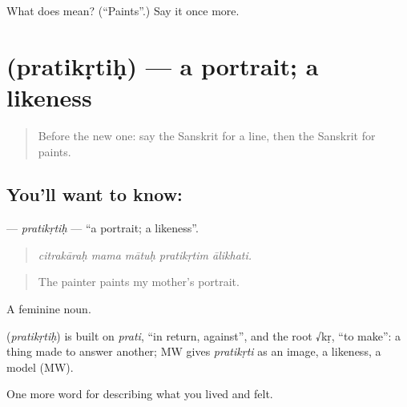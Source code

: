 \begin{tcolorbox}[breakable,colback=teal!4,colframe=teal!35!black,title={Before you move on}]
What does  mean? (\textquotedblleft{}Paints\textquotedblright{}.) Say it once more.
\end{tcolorbox}
\section[\texorpdfstring{\sk{प्रतिकृतिः} (pratikṛtiḥ)}{प्रतिकृतिः (pratikṛtiḥ)}]{ (pratikṛtiḥ) — a portrait; a likeness}

\label{lesson:SA-C518-pratikrtih}



\begin{quote}
Before the new one: say the Sanskrit for a line, then the Sanskrit for paints.
\end{quote}

\subsection*{You'll want to know: }
\textbf{} — \emph{pratikṛtiḥ} — \textquotedblleft{}a portrait; a likeness\textquotedblright{}.

\begin{quote}
    
\end{quote}

\begin{quote}
\emph{citrakāraḥ mama mātuḥ pratikṛtim ālikhati.}
\end{quote}

\begin{quote}
The painter paints my mother's portrait.
\end{quote}

A feminine noun.

\begin{cousinweb}
\textbf{} (\emph{pratikṛtiḥ}) is built on \emph{prati}, \textquotedblleft{}in return, against\textquotedblright{}, and the root √kṛ, \textquotedblleft{}to make\textquotedblright{}: a thing made to answer another; MW gives \emph{pratikṛti} as an image, a likeness, a model (MW).
\end{cousinweb}

\begin{grammarlens}[title={What you've built}]
One more word for describing what you lived and felt.
\end{grammarlens}

